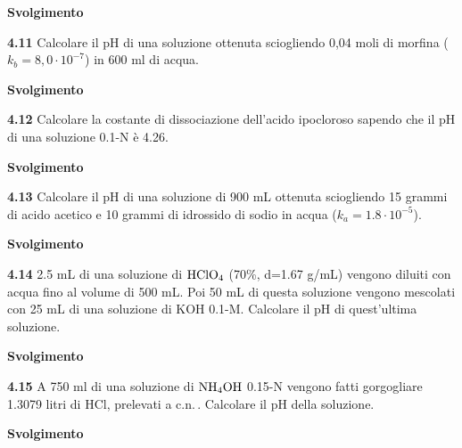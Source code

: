 \vspace{0.2cm}\large\textbf{Svolgimento}\normalsize

\vspace{0.2cm}

\vspace{0.2cm}\textbf{4.11} Calcolare il pH di una soluzione ottenuta sciogliendo 0,04 moli di morfina ($k_b = 8,0 \cdot 10^{-7}$) in 600 ml di acqua.

\vspace{0.2cm}\large\textbf{Svolgimento}\normalsize

\vspace{0.2cm}

\vspace{0.2cm}\textbf{4.12} Calcolare la costante di dissociazione dell'acido ipocloroso sapendo che il pH di una soluzione 0.1-N è 4.26.

\vspace{0.2cm}\large\textbf{Svolgimento}\normalsize

\vspace{0.2cm}

\vspace{0.2cm}\textbf{4.13} Calcolare il pH di una soluzione di 900 mL ottenuta sciogliendo 15 grammi di acido acetico e 10 grammi di idrossido di sodio in acqua ($k_a = 1.8 \cdot 10^{-5}$).

\vspace{0.2cm}\large\textbf{Svolgimento}\normalsize

\vspace{0.2cm}

\vspace{0.2cm}\textbf{4.14} 2.5 mL di una soluzione di $\rm HClO_4$ (70\%, d=1.67 g/mL) vengono diluiti con acqua fino al
volume di 500 mL. Poi 50 mL di questa soluzione vengono mescolati con 25 mL di una soluzione di KOH 0.1-M. Calcolare il pH di quest’ultima soluzione.

\vspace{0.2cm}\large\textbf{Svolgimento}\normalsize

\vspace{0.2cm}

\vspace{0.2cm}\textbf{4.15} A 750 ml di una soluzione di $\rm NH_4OH$ 0.15-N vengono fatti gorgogliare 1.3079 litri di HCl, prelevati a c.n.\,. Calcolare il pH della soluzione.

\vspace{0.2cm}\large\textbf{Svolgimento}\normalsize

